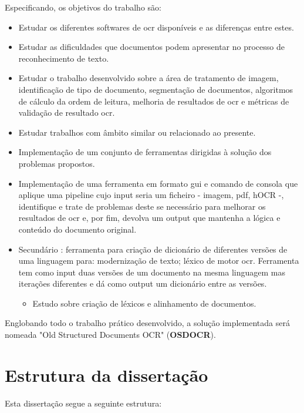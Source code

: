 Especificando, os objetivos do trabalho são:
\begin{itemize}
    \item Estudar os diferentes softwares de \acrshort{ocr} disponíveis e as diferenças entre estes.
    \item Estudar as dificuldades que documentos podem apresentar no processo de reconhecimento de texto.
    \item Estudar o trabalho desenvolvido sobre a área de tratamento de imagem, identificação de tipo de documento, segmentação de documentos, algoritmos de cálculo da ordem de leitura, melhoria de resultados de \acrshort{ocr} e métricas de validação de resultado \acrshort{ocr}.
    \item Estudar trabalhos com âmbito similar ou relacionado ao presente.
    \item Implementação de um conjunto de ferramentas dirigidas à solução dos problemas propostos.
    \item Implementação de uma ferramenta em formato \acrshort{gui} e comando de consola que aplique uma pipeline cujo input seria um ficheiro - imagem, pdf, hOCR -, identifique e trate de problemas deste se necessário para melhorar os resultados de \acrshort{ocr} e, por fim, devolva um output que mantenha a lógica e conteúdo do documento original.
    \item Secundário : ferramenta para criação de dicionário de diferentes versões de uma linguagem para: modernização de texto; léxico de motor \acrshort{ocr}. Ferramenta tem como input duas versões de um documento na mesma linguagem mas iterações diferentes e dá como output um dicionário entre as versões.
    \begin{itemize}
        \item Estudo sobre criação de léxicos e alinhamento de documentos.
    \end{itemize}
\end{itemize}

Englobando todo o trabalho prático desenvolvido, a solução implementada será nomeada "Old Structured Documents OCR" (\textbf{OSDOCR}).



\section{Estrutura da dissertação}

Esta dissertação segue a seguinte estrutura:

